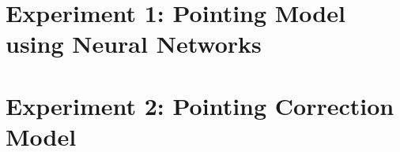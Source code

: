 \section{Experiment 1: Pointing Model using Neural Networks}

\section{Experiment 2: Pointing Correction Model}